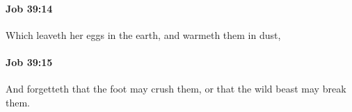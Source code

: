 		\paragraph{Job 39:14} %
			\label{JOB-39-14}

			Which leaveth her eggs in the earth, and warmeth them in dust,


		\paragraph{Job 39:15} %
			\label{JOB-39-15}

			And forgetteth that the foot may crush them, or that the wild beast may break them.


